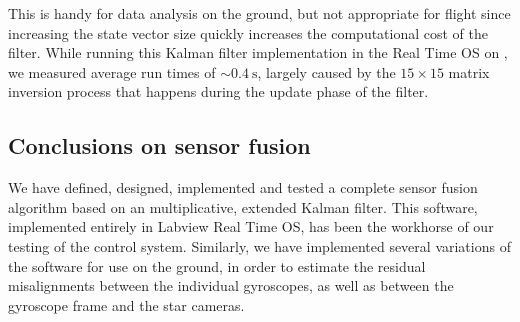 This is handy for data analysis on the ground, but not appropriate for flight since increasing the state vector size quickly increases the computational cost of the filter. While running this Kalman filter implementation in the Real Time OS on \boop, we measured average run times of $\sim\SI{0.4}{\second}$, largely caused by the $15\times 15$ matrix inversion process that happens during the update phase of the filter.

%
%

\subsection{Conclusions on sensor fusion}

We have defined, designed, implemented and tested a complete sensor fusion algorithm based on an multiplicative, extended Kalman filter. This software, implemented entirely in Labview Real Time OS, has been the workhorse of our testing of the control system. Similarly, we have implemented several variations of the software for use on the ground, in order to estimate the residual misalignments between the individual gyroscopes, as well as between the gyroscope frame and the star cameras.

